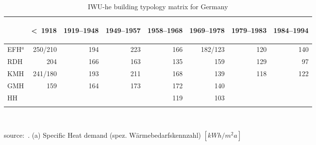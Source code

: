 \begin{table}[htbp]
  \centering
  \caption{IWU-he building typology matrix for Germany}\label{tab:IWU-he}%
    \begin{tabular}{l r rrr rrr}
    \addlinespace
    \toprule
    &
    \begin{sideways}\textless~1918	\end{sideways}&  
    \begin{sideways}1919--1948   \end{sideways}&  
    \begin{sideways}1949--1957   \end{sideways}&  
    \begin{sideways}1958--1968   \end{sideways}&  
    \begin{sideways}1969--1978   \end{sideways}&  
    \begin{sideways}1979--1983   \end{sideways}&  
    \begin{sideways}1984--1994   \end{sideways}\\
    \midrule
EFH$^a$ &250/210&194&223&166&182/123&120&140 \\
RDH     &204    &166&163&135    &159&129&97  \\
KMH     &241/180&193&211&168    &139&118&122 \\
GMH     &159    &164&173&172    &140&   &    \\ 
HH      &       &   &   &119    &103&   &    \\ 
    \bottomrule
    \addlinespace
    \end{tabular}\\
    \begin{footnotesize}    
    source:~\cite{Born.2003}.
    (a) Specific Heat demand (spez. W\"armebedarfskennzahl)
    $[kWh/m^{2}a]$\\
    
    \end{footnotesize}
\end{table}
